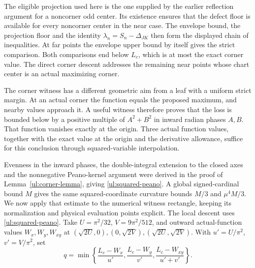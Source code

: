 The eligible projection used here is the one supplied by the earlier
reflection argument for a noncorner odd center. Its existence ensures
that the defect floor is available for every noncorner center in the
near case. The envelope bound, the projection floor and the identity
$\lambda_n=S_n-\Delta_{JK}$ then form the displayed chain of
inequalities. At far points the envelope upper bound by itself gives
the strict comparison. Both comparisons end below $L_c$, which is at
most the exact corner value. The direct corner descent addresses the
remaining near points whose chart center is an actual maximizing
corner.

The corner witness has a different geometric aim from a leaf with a
uniform strict margin. At an actual corner the function equals the
proposed maximum, and nearby values approach it. A useful witness
therefore proves that the loss is bounded below by a positive multiple
of $A^2+B^2$ in inward radian phases $A,B$. That function vanishes
exactly at the origin. Three actual function values, together with
the exact value at the origin and the derivative allowance, suffice
for this conclusion through squared-variable interpolation.

Evenness in the inward phases, the double-integral extension to the
closed axes and the nonnegative Peano-kernel argument were derived
in the proof of Lemma~\ref{ul:corner-lemma}, giving
\eqref{ul:squared-peano}. A global signed-cardinal bound $M$ gives
the same squared-coordinate curvature bounds $M/3$ and $\mu^4M/3$.
We now apply that estimate to the numerical witness rectangle,
keeping its normalization and physical evaluation points explicit.
The local descent uses \eqref{ul:squared-peano}. Take
$U=\pi^2/32$, $V=9\pi^2/512$, and outward actual-function values
$W_x,W_y,W_{xy}$ at $(\sqrt{2U},0),(0,\sqrt{2V}),
(\sqrt{2U},\sqrt{2V})$. With $u'=U/\pi^2$, $v'=V/\pi^2$, set
\[
 q=\min\left\{\frac{L_c-W_x}{u'},\frac{L_c-W_y}{v'},
                         \frac{L_c-W_{xy}}{u'+v'}\right\}.
\]

